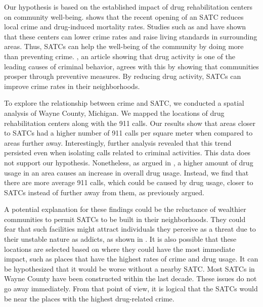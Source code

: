 \documentclass[12pt]{article}
\begin{document}
Our hypothesis is based on the established impact of drug rehabilitation centers on community well-being. \cite{SAT_centers_and_crime} shows that the recent opening of an SATC reduces local crime and drug-induced mortality rates. Studies such as \cite{drugs_and_crime}
and \cite{mental_healthcare_and_crime}  have shown that these centers can lower crime rates and raise living standards in surrounding areas. Thus, SATCs can help the well-being of the community by doing more than preventing crime. \cite{drugs_crime_space_time}, an article showing that drug activity is one of the leading causes of criminal behavior, agrees with this by showing that communities prosper through preventive measures. By reducing drug activity, SATCs can improve crime rates in their neighborhoods. 

To explore the relationship between crime and SATC, we conducted a spatial analysis of Wayne County, Michigan. We mapped the locations of drug rehabilitation centers along with the 911 calls. Our results show that areas closer to SATCs had a higher number of 911 calls per square meter when compared to areas further away. Interestingly, further analysis revealed that this trend persisted even when isolating calls related to criminal activities. This data does not support our hypothesis. Nonetheless, as argued in \cite{Socioeconomic-Determinants}, a higher amount of drug usage in an area causes an increase in overall drug usage. Instead, we find that there are more average 911 calls, which could be caused by drug usage, closer to SATCs instead of further away from them, as previously argued. 

A potential explanation for these findings could be the reluctance of wealthier communities to permit SATCs to be built in their neighborhoods. They could fear that such facilities might attract individuals they perceive as a threat due to their unstable nature as addicts, as shown in \cite{mental_health_and_disability}. It is also possible that these locations are selected based on where they could have the most immediate impact, such as places that have the highest rates of crime and drug usage. It can be hypothesized that it would be worse without a nearby SATC. Most SATCs in Wayne County have been constructed within the last decade. These issues do not go away immediately. From that point of view, it is logical that the SATCs would be near the places with the highest drug-related crime.
\end{document}
